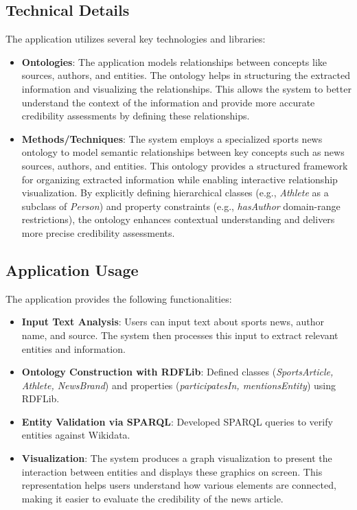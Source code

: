 \documentclass[11pt]{article}
\begin{document}
\subsection{Technical Details}
The application utilizes several key technologies and libraries:
\begin{itemize}
    \item \textbf{Ontologies}: The application models relationships between concepts like sources, authors, and entities. The ontology helps in structuring the extracted information and visualizing the relationships. This allows the system to better understand the context of the information and provide more accurate credibility assessments by defining these relationships.
    \item \textbf{Methods/Techniques}: The system employs a specialized sports news ontology to model semantic relationships between key concepts such as news sources, authors, and entities. This ontology provides a structured framework for organizing extracted information while enabling interactive relationship visualization. By explicitly defining hierarchical classes (e.g., \textit{Athlete} as a subclass of \textit{Person}) and property constraints (e.g., \textit{hasAuthor} domain-range restrictions), the ontology enhances contextual understanding and delivers more precise credibility assessments.
\end{itemize}

\subsection{Application Usage}
The application provides the following functionalities:
\begin{itemize}
    \item \textbf{Input Text Analysis}: Users can input text about sports news, author name, and source. The system then processes this input to extract relevant entities and information.
    \item \textbf{Ontology Construction with RDFLib}: Defined classes (\textit{SportsArticle, Athlete, NewsBrand}) and properties (\textit{participatesIn, mentionsEntity}) using RDFLib.
    \item \textbf{Entity Validation via SPARQL}: Developed SPARQL queries to verify entities against Wikidata.
    \item \textbf{Visualization}: The system produces a graph visualization to present the interaction between entities and displays these graphics on screen. This representation helps users understand how various elements are connected, making it easier to evaluate the credibility of the news article.
\end{itemize}
\end{document}
